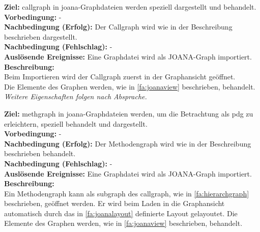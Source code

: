 \label{fa:callview}
\textbf{Ziel:} \gls{callgraph} in \gls{joana}-Graphdateien werden speziell dargestellt und behandelt.\\
\textbf{Vorbedingung:} -\\
\textbf{Nachbedingung (Erfolg):} Der Callgraph wird wie in der Beschreibung beschrieben dargestellt.\\
\textbf{Nachbedingung (Fehlschlag):} -\\
\textbf{Auslösende Ereignisse:} Eine Graphdatei wird als JOANA-Graph importiert.\\
\textbf{Beschreibung:}\\
Beim Importieren wird der Callgraph zuerst in der Graphansicht geöffnet.\\
Die Elemente des Graphen werden, wie in \ref{fa:joanaview} beschrieben, behandelt.
\textit{Weitere Eigenschaften folgen nach Absprache.}

\label{fa:methview}
\textbf{Ziel:} \gls{methgraph} in \gls{joana}-Graphdateien werden, um die Betrachtung als \gls{pdg} zu erleichtern, speziell behandelt und dargestellt.\\
\textbf{Vorbedingung:} -\\
\textbf{Nachbedingung (Erfolg):} Der Methodengraph wird wie in der Beschreibung beschrieben behandelt. \\
\textbf{Nachbedingung (Fehlschlag):} -\\
\textbf{Auslösende Ereignisse:} Eine Graphdatei wird als JOANA-Graph importiert.\\
\textbf{Beschreibung:}\\
Ein Methodengraph kann als \gls{subgraph} des \gls{callgraph}, wie in \ref{fa:hierarchgraph} beschrieben, geöffnet werden.
Er wird beim Laden in die Graphansicht automatisch durch das in \ref{fa:joanalayout} definierte Layout gelayoutet.
Die Elemente des Graphen werden, wie in \ref{fa:joanaview} beschrieben, behandelt.


